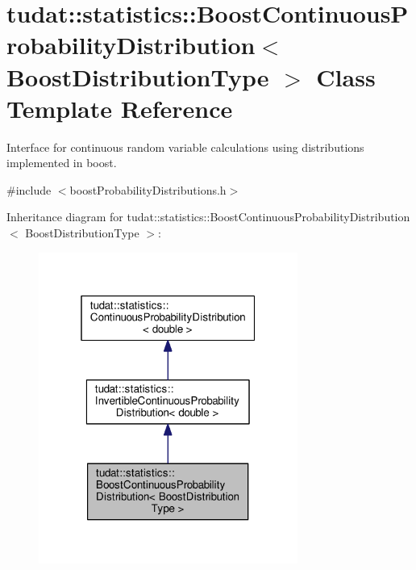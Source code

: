 \hypertarget{classtudat_1_1statistics_1_1BoostContinuousProbabilityDistribution}{}\section{tudat\+:\+:statistics\+:\+:Boost\+Continuous\+Probability\+Distribution$<$ Boost\+Distribution\+Type $>$ Class Template Reference}
\label{classtudat_1_1statistics_1_1BoostContinuousProbabilityDistribution}


Interface for continuous random variable calculations using distributions implemented in boost.  




{\ttfamily \#include $<$boost\+Probability\+Distributions.\+h$>$}



Inheritance diagram for tudat\+:\+:statistics\+:\+:Boost\+Continuous\+Probability\+Distribution$<$ Boost\+Distribution\+Type $>$\+:
\nopagebreak
\begin{figure}[H]
\begin{center}
\leavevmode
\includegraphics[width=241pt]{classtudat_1_1statistics_1_1BoostContinuousProbabilityDistribution__inherit__graph}
\end{center}
\end{figure}


